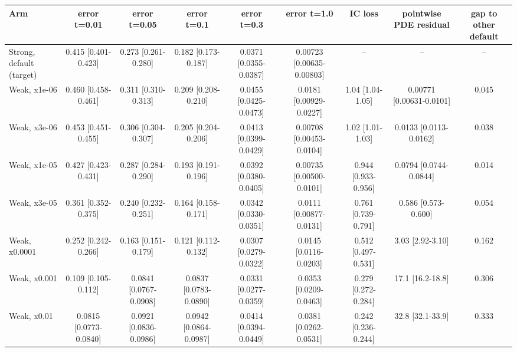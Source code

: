 \begin{tabular}{lcccccccc}
\toprule
Arm & error t=0.01 & error t=0.05 & error t=0.1 & error t=0.3 & error t=1.0 & IC loss & pointwise PDE residual & gap to other default \\
\midrule
Strong, default (target) & 0.415 {\scriptsize[0.401-0.423]} & 0.273 {\scriptsize[0.261-0.280]} & 0.182 {\scriptsize[0.173-0.187]} & 0.0371 {\scriptsize[0.0355-0.0387]} & 0.00723 {\scriptsize[0.00635-0.00803]} & -- & -- & -- \\
Weak, x1e-06 & 0.460 {\scriptsize[0.458-0.461]} & 0.311 {\scriptsize[0.310-0.313]} & 0.209 {\scriptsize[0.208-0.210]} & 0.0455 {\scriptsize[0.0425-0.0473]} & 0.0181 {\scriptsize[0.00929-0.0227]} & 1.04 {\scriptsize[1.04-1.05]} & 0.00771 {\scriptsize[0.00631-0.0101]} & 0.045 \\
Weak, x3e-06 & 0.453 {\scriptsize[0.451-0.455]} & 0.306 {\scriptsize[0.304-0.307]} & 0.205 {\scriptsize[0.204-0.206]} & 0.0413 {\scriptsize[0.0399-0.0429]} & 0.00708 {\scriptsize[0.00453-0.0104]} & 1.02 {\scriptsize[1.01-1.03]} & 0.0133 {\scriptsize[0.0113-0.0162]} & 0.038 \\
Weak, x1e-05 & 0.427 {\scriptsize[0.423-0.431]} & 0.287 {\scriptsize[0.284-0.290]} & 0.193 {\scriptsize[0.191-0.196]} & 0.0392 {\scriptsize[0.0380-0.0405]} & 0.00735 {\scriptsize[0.00500-0.0101]} & 0.944 {\scriptsize[0.933-0.956]} & 0.0794 {\scriptsize[0.0744-0.0844]} & 0.014 \\
Weak, x3e-05 & 0.361 {\scriptsize[0.352-0.375]} & 0.240 {\scriptsize[0.232-0.251]} & 0.164 {\scriptsize[0.158-0.171]} & 0.0342 {\scriptsize[0.0330-0.0351]} & 0.0111 {\scriptsize[0.00877-0.0131]} & 0.761 {\scriptsize[0.739-0.791]} & 0.586 {\scriptsize[0.573-0.600]} & 0.054 \\
Weak, x0.0001 & 0.252 {\scriptsize[0.242-0.266]} & 0.163 {\scriptsize[0.151-0.179]} & 0.121 {\scriptsize[0.112-0.132]} & 0.0307 {\scriptsize[0.0279-0.0322]} & 0.0145 {\scriptsize[0.0116-0.0203]} & 0.512 {\scriptsize[0.497-0.531]} & 3.03 {\scriptsize[2.92-3.10]} & 0.162 \\
Weak, x0.001 & 0.109 {\scriptsize[0.105-0.112]} & 0.0841 {\scriptsize[0.0767-0.0908]} & 0.0837 {\scriptsize[0.0783-0.0890]} & 0.0331 {\scriptsize[0.0277-0.0359]} & 0.0353 {\scriptsize[0.0209-0.0463]} & 0.279 {\scriptsize[0.272-0.284]} & 17.1 {\scriptsize[16.2-18.8]} & 0.306 \\
Weak, x0.01 & 0.0815 {\scriptsize[0.0773-0.0840]} & 0.0921 {\scriptsize[0.0836-0.0986]} & 0.0942 {\scriptsize[0.0864-0.0987]} & 0.0414 {\scriptsize[0.0394-0.0449]} & 0.0381 {\scriptsize[0.0262-0.0531]} & 0.242 {\scriptsize[0.236-0.244]} & 32.8 {\scriptsize[32.1-33.9]} & 0.333 \\

\end{tabular}
